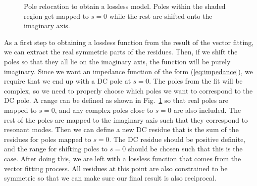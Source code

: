 \begin{figure}[h!]
{}

    \caption{Pole relocation to obtain a lossless model. Poles within the shaded region get mapped to $s=0$ while the rest are shifted onto the imaginary axis.}
    \label{fig:pole_relocation}
\end{figure}

As a first step to obtaining a lossless function from the result of the vector fitting, we can extract the real symmetric parts of the residues. Then, if we shift the poles so that they all lie on the imaginary axis, the function will be purely imaginary. Since we want an impedance function of the form (\ref{eq:impedance}), we require that we end up with a DC pole at $s=0$. The poles from the fit will be complex, so we need to properly choose which poles we want to correspond to the DC pole. A range can be defined as shown in Fig.\ \ref{fig:pole_relocation} so that real poles are mapped to $s=0$, and any complex poles close to $s=0$ are also included. The rest of the poles are mapped to the imaginary axis such that they correspond to resonant modes. Then we can define a new DC residue that is the sum of the residues for poles mapped to $s=0$. The DC residue should be positive definite, and the range for shifting poles to $s=0$ should be chosen such that this is the case. After doing this, we are left with a lossless function that comes from the vector fitting process. All residues at this point are also constrained to be symmetric so that we can make sure our final result is also reciprocal.

